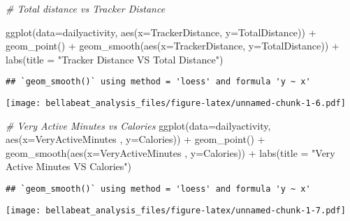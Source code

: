 \documentclass[
]{article}
\newenvironment{Shaded}{\begin{snugshade}}{\end{snugshade}}
\newcommand{\AttributeTok}[1]{\textcolor[rgb]{0.77,0.63,0.00}{#1}}
\newcommand{\CommentTok}[1]{\textcolor[rgb]{0.56,0.35,0.01}{\textit{#1}}}
\newcommand{\FunctionTok}[1]{\textcolor[rgb]{0.00,0.00,0.00}{#1}}
\newcommand{\NormalTok}[1]{#1}
\newcommand{\SpecialCharTok}[1]{\textcolor[rgb]{0.00,0.00,0.00}{#1}}
\newcommand{\StringTok}[1]{\textcolor[rgb]{0.31,0.60,0.02}{#1}}
\begin{document}
\begin{Shaded}
\begin{Highlighting}[]
\CommentTok{\# Total distance vs Tracker Distance}

\FunctionTok{ggplot}\NormalTok{(}\AttributeTok{data=}\NormalTok{dailyactivity, }\FunctionTok{aes}\NormalTok{(}\AttributeTok{x=}\NormalTok{TrackerDistance, }\AttributeTok{y=}\NormalTok{TotalDistance)) }\SpecialCharTok{+}
  \FunctionTok{geom\_point}\NormalTok{() }\SpecialCharTok{+} 
  \FunctionTok{geom\_smooth}\NormalTok{(}\FunctionTok{aes}\NormalTok{(}\AttributeTok{x=}\NormalTok{TrackerDistance, }\AttributeTok{y=}\NormalTok{TotalDistance)) }\SpecialCharTok{+}
  \FunctionTok{labs}\NormalTok{(}\AttributeTok{title =} \StringTok{"Tracker Distance VS Total Distance"}\NormalTok{)}
\end{Highlighting}
\end{Shaded}

\begin{verbatim}
## `geom_smooth()` using method = 'loess' and formula 'y ~ x'
\end{verbatim}

\texttt{[image: bellabeat\_analysis\_files/figure-latex/unnamed-chunk-1-6.pdf]}

\begin{Shaded}
\begin{Highlighting}[]
\CommentTok{\# Very Active Minutes vs Calories}
\FunctionTok{ggplot}\NormalTok{(}\AttributeTok{data=}\NormalTok{dailyactivity, }\FunctionTok{aes}\NormalTok{(}\AttributeTok{x=}\NormalTok{VeryActiveMinutes , }\AttributeTok{y=}\NormalTok{Calories)) }\SpecialCharTok{+}
  \FunctionTok{geom\_point}\NormalTok{() }\SpecialCharTok{+} 
  \FunctionTok{geom\_smooth}\NormalTok{(}\FunctionTok{aes}\NormalTok{(}\AttributeTok{x=}\NormalTok{VeryActiveMinutes , }\AttributeTok{y=}\NormalTok{Calories)) }\SpecialCharTok{+}
  \FunctionTok{labs}\NormalTok{(}\AttributeTok{title =} \StringTok{"Very Active Minutes VS Calories"}\NormalTok{)}
\end{Highlighting}
\end{Shaded}

\begin{verbatim}
## `geom_smooth()` using method = 'loess' and formula 'y ~ x'
\end{verbatim}

\texttt{[image: bellabeat\_analysis\_files/figure-latex/unnamed-chunk-1-7.pdf]}
\end{document}
